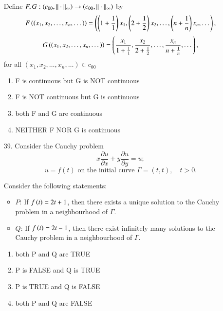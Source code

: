 \documentclass[journal]{IEEEtran}
\begin{document}
\begin{enumerate}
Define $F, G : \left(c_{00}, \|\cdot\|_{\infty}\right) \to \left(c_{00}, \|\cdot\|_{\infty}\right) $ by
$$
F\left(\left(x_1, x_2, \dots, x_n, \dots\right)\right) = \left( \left(1 + \frac{1}{1}\right)x_1, \left(2 + \frac{1}{2}\right)x_2, \dots, \left(n + \frac{1}{n}\right)x_n, \dots\right),
$$
$$
G\left(\left(x_1, x_2, \dots, x_n, \dots\right)\right) = \left( \frac{x_1}{1 + \frac{1}{1}}, \frac{x_2}{2 + \frac{1}{2}}, \dots, \frac{x_n}{n + \frac{1}{n}}, \dots \right),
$$
for all $(x_1, x_2, \dots, x_n, \dots) \in c_{00}$
\begin{enumerate}[label=(\Alph*)]
    \item F is continuous but G is NOT continuous
    \item F is NOT continuous but G is continuous
    \item both F and G are continuous 
    \item NEITHER F NOR G is continuous 
\end{enumerate}
\item[39.] Consider the Cauchy problem
$$
x \frac{\partial u}{\partial x} + y \frac{\partial u}{\partial y} = u;
$$
$$
u = f(t) \text{ on the initial curve } \Gamma = (t, t), \quad t > 0.
$$

Consider the following statements:

\begin{itemize}
    \item $ P $: If $ f\left(t\right) = 2t + 1 $, then there exists a unique solution to the Cauchy problem in a neighbourhood of \( \Gamma \).
    \item $ Q $: If $ f\left(t\right) = 2t - 1 $, then there exist infinitely many solutions to the Cauchy problem in a neighbourhood of \( \Gamma \).
\end{itemize}
\begin{enumerate}[label=(\Alph*)]
    \item both P and Q are TRUE
    \item P is FALSE and Q is TRUE
    \item P is TRUE and Q is FALSE
    \item both P and Q are FALSE

\end{enumerate}

 
\end{enumerate}
\end{document}
